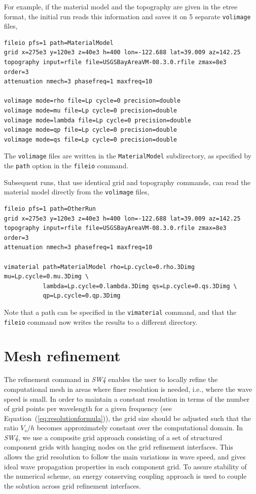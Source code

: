 \documentclass[11pt]{report}
\begin{document}
For example, if the material model and the topography are given in the etree format, the initial run
reads this information and saves it on 5 separate \verb+volimage+ files,
\begin{verbatim}
fileio pfs=1 path=MaterialModel
grid x=275e3 y=120e3 z=40e3 h=400 lon=-122.688 lat=39.009 az=142.25
topography input=rfile file=USGSBayAreaVM-08.3.0.rfile zmax=8e3 order=3
attenuation nmech=3 phasefreq=1 maxfreq=10

volimage mode=rho file=Lp cycle=0 precision=double
volimage mode=mu file=Lp cycle=0 precision=double
volimage mode=lambda file=Lp cycle=0 precision=double
volimage mode=qp file=Lp cycle=0 precision=double
volimage mode=qs file=Lp cycle=0 precision=double
\end{verbatim}
The \verb+volimage+ files are written in the \verb+MaterialModel+ subdirectory, as specified by the
\verb+path+ option in the \verb+fileio+ command.

Subsequent runs, that use identical grid and topography commands, can read the material
model directly from the \verb+volimage+ files,
\begin{verbatim}
fileio pfs=1 path=OtherRun
grid x=275e3 y=120e3 z=40e3 h=400 lon=-122.688 lat=39.009 az=142.25
topography input=rfile file=USGSBayAreaVM-08.3.0.rfile zmax=8e3 order=3
attenuation nmech=3 phasefreq=1 maxfreq=10

vimaterial path=MaterialModel rho=Lp.cycle=0.rho.3Dimg mu=Lp.cycle=0.mu.3Dimg \
           lambda=Lp.cycle=0.lambda.3Dimg qs=Lp.cycle=0.qs.3Dimg \
           qp=Lp.cycle=0.qp.3Dimg
\end{verbatim}
Note that a path can be specified in the \verb+vimaterial+ command, and that the \verb+fileio+
command now writes the results to a different directory.

\chapter{Mesh refinement} \label{sec:mesh-ref}
\index{mesh refinement}

The refinement command in \emph{SW4} enables the user to locally refine the computational mesh in
areas where finer resolution is needed, i.e., where the wave speed is small. In order to maintain a
constant resolution in terms of the number of grid points per wavelength for a given frequency (see
Equation~(\ref{eq:resolutionformula})), the grid size should be adjusted such that the ratio $V_s/h$
becomes approximately constant over the computational domain. In \emph{SW4}, we use a composite grid
approach consisting of a set of structured component grids with hanging nodes on the grid refinement
interfaces. This allows the grid resolution to follow the main variations in wave speed, and gives
ideal wave propagation properties in each component grid. To assure stability of the numerical
scheme, an energy conserving coupling approach is used to couple the solution across grid refinement
interfaces.
\end{document}

